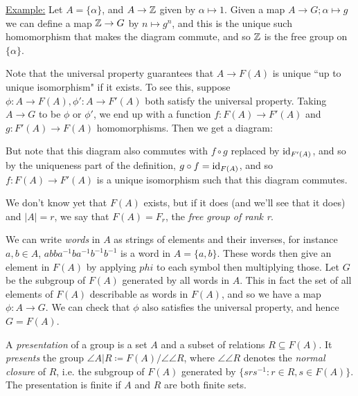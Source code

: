 \documentclass[10pt,a4paper]{article}
\begin{document}
\underline{Example:} Let $A = \{\alpha\}$, and $A \to \mathbb{Z}$ given by $\alpha \mapsto 1$. Given a map $A \to G; \alpha \mapsto g$ we can define a map $\mathbb{Z} \to G$ by $n \mapsto g^n$, and this is the unique such homomorphism that makes the diagram commute, and so $\mathbb{Z}$ is the free group on $\{\alpha\}$.

Note that the universal property guarantees that $A \to F(A)$ is unique ``up to unique isomorphism" if it exists. To see this, suppose $\phi:A \to F(A), \phi':A \to F'(A)$ both satisfy the universal property. Taking $A \to G$ to be $\phi$ or $\phi'$, we end up with a function $f:F(A) \to F'(A)$ and $g:F'(A) \to F(A)$ homomorphisms. Then we get a diagram:
\begin{center}
\end{center}
But note that this diagram also commutes with $f\circ g$ replaced by $\operatorname{id}_{F'(A)}$, and so by the uniqueness part of the definition, $g \circ f = \operatorname{id}_{F(A)}$, and so $f:F(A) \to F'(A)$ is a unique isomorphism such that this diagram commutes.

We don't know yet that $F(A)$ exists, but if it does (and we'll see that it does) and $|A|=r$, we say that $F(A) = F_r$, the \emph{free group of rank r}.

We can write \emph{words} in $A$ as strings of elements and their inverses, for instance $a,b \in A$, $abba^{-1}ba^{-1}b^{-1}b^{-1}$ is a word in $A = \{a,b\}$. These words then give an element in $F(A)$ by applying $phi$ to each symbol then multiplying those. Let $G$ be the subgroup of $F(A)$ generated by all words in $A$. This in fact the set of all elements of $F(A)$ describable as words in $F(A)$, and so we have a map $\phi:A \to G$. We can check that $\phi$ also satisfies the universal property, and hence $G=F(A)$.

A \emph{presentation} of a group is a set $A$ and a subset of relations $R \subseteq F(A)$. It \emph{presents} the group $\angle{A|R}\coloneqq F(A) / \angle{\angle{R}}$, where $\angle{\angle{R}}$ denotes the \emph{normal closure} of $R$, i.e. the subgroup of $F(A)$ generated by $\{srs^{-1} : r \in R, s \in F(A)\}$. The presentation is finite if $A$ and $R$ are both finite sets.
\end{document}

